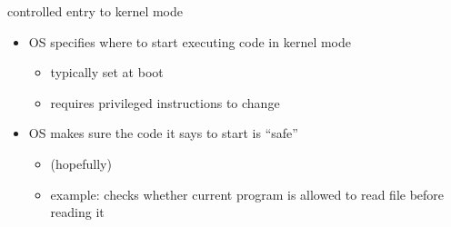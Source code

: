 \begin{frame}{controlled entry to kernel mode}
\begin{itemize}
\item OS specifies where to start executing code in kernel mode
    \begin{itemize}
    \item typically set at boot
    \item requires privileged instructions to change
    \end{itemize}
\item OS makes sure the code it says to start is ``safe''
    \begin{itemize}
    \item (hopefully)
    \item example: checks whether current program is allowed to read file before reading it
    \end{itemize}
\end{itemize}
\end{frame}
